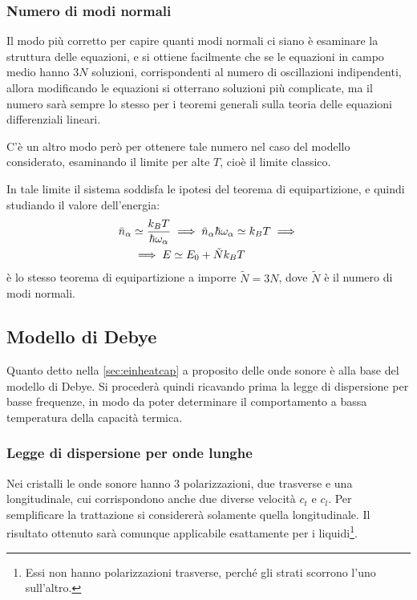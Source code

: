 \subsubsection{Numero di modi normali}

Il modo più corretto per capire quanti modi normali ci siano è esaminare la struttura delle equazioni, e si ottiene facilmente che se le equazioni in campo medio hanno $ 3N $ soluzioni, corrispondenti al numero di oscillazioni indipendenti, allora modificando le equazioni si otterrano soluzioni più complicate, ma il numero sarà sempre lo stesso per i teoremi generali sulla teoria delle equazioni differenziali lineari.
\newline

C'è un altro modo però per ottenere tale numero nel caso del modello considerato, esaminando il limite per alte $ T $, cioè il limite classico.

In tale limite il sistema soddisfa le ipotesi del teorema di equipartizione, e quindi studiando il valore dell'energia:
\begin{align*}
 \bar{n}_\alpha &\simeq \frac{k_B T}{\hbar \omega_\alpha} \implies  \bar{n}_\alpha \hbar \omega_\alpha \simeq k_B T \implies \\
 &\implies E \simeq E_0 + \tilde{N} k_B T
\end{align*}
è lo stesso teorema di equipartizione a imporre $ \tilde{N} = 3N  $, dove $ \tilde{N} $ è il numero di modi normali.

\subsection{Modello di Debye}

Quanto detto nella \cref{sec:einheatcap} a proposito delle onde sonore è alla base del modello di Debye. Si procederà quindi ricavando prima la legge di dispersione per basse frequenze, in modo da poter determinare il comportamento a bassa temperatura della capacità termica.

\subsubsection{Legge di dispersione per onde lunghe}

Nei cristalli le onde sonore hanno $ 3 $ polarizzazioni, due trasverse e una longitudinale, cui corrispondono anche due diverse velocità $ c_t $ e $ c_l $.
Per semplificare la trattazione si considererà solamente quella longitudinale.
Il risultato ottenuto sarà comunque applicabile esattamente per i liquidi\footnote{Essi non hanno polarizzazioni trasverse, perché gli strati scorrono l'uno sull'altro.}.
\newline

